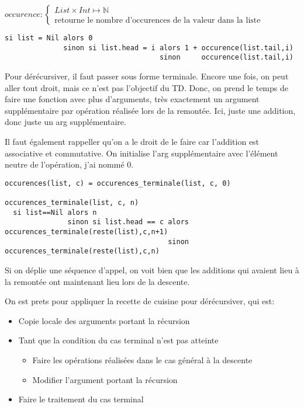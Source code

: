 \documentclass[10pt]{article}\usepackage[correction]{esial}
\begin{document}
\begin{Question}
  $occurence: \left\{
    \begin{array}{l}
      List\times Int\mapsto \mathbb{N}\\
      \text{retourne le nombre d'occurences de la valeur dans la liste}
    \end{array}\right.$  
\end{Question}
\begin{Reponse}
  \begin{Verbatim}[label=occurences(list\quotesinglbase c)]
si list = Nil alors 0
              sinon si list.head = i alors 1 + occurence(list.tail,i)
                                     sinon     occurence(list.tail,i)    
  \end{Verbatim}
  Pour dérécursiver, il faut passer sous forme terminale. Encore une fois, on
  peut aller tout droit, mais ce n'est pas l'objectif du TD. Donc, on prend le
  temps de faire une fonction avec plus d'arguments, très exactement un
  argument supplémentaire par opération réalisée lors de la remontée. Ici,
  juste une addition, donc juste un arg supplémentaire.

  Il faut également rappeller qu'on a le droit de le faire car l'addition est
  associative et commutative. On initialise l'arg supplémentaire avec l'élément
  neutre de l'opération, j'ai nommé 0.
  \begin{Verbatim}[label=occurences(list\quotesinglbase c) terminale]
occurences(list, c) = occurences_terminale(list, c, 0)

occurences_terminale(list, c, n)
  si list==Nil alors n
               sinon si list.head == c alors occurences_terminale(reste(list),c,n+1)
                                       sinon occurences_terminale(reste(list),c,n)
  \end{Verbatim}

  Si on déplie une séquence d'appel, on voit bien que les additions qui avaient
  lieu à la remontée ont maintenant lieu lors de la descente. 

  On est prets pour appliquer la recette de cuisine pour dérécursiver, qui est:
  \begin{itemize}
  \item Copie locale des arguments portant la récursion
  \item Tant que la condition du cas terminal n'est pas atteinte
    \begin{itemize}
    \item Faire les opérations réalisées dans le cas général à la descente
    \item Modifier l'argument portant la récursion
    \end{itemize}
  \item Faire le traitement du cas terminal


\end{itemize}
\end{Reponse}
\end{document}
